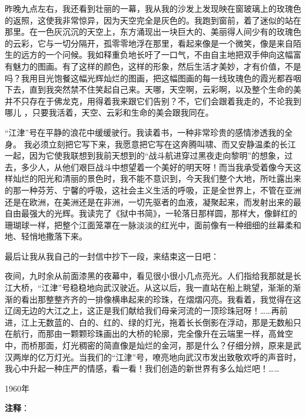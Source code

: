 \documentclass[12pt,UTF-8,openany]{ctexbook}
\begin{document}
\begin{normalsize}
    昨晚九点左右，我还看到壮丽的一幕，我从我的沙发上发现映在窗玻璃上的玫瑰色的返照，这使我非常惊异，因为天空完全是灰色的。我跑到窗前，着了迷似的站在那里。在一色灰沉沉的天空上，东方涌现出一块巨大的、美丽得人间少有的玫瑰色的云彩，它与一切分隔开，孤零零地浮在那里，看起来像是一个微笑，像是来自陌生的远方的一个问候。我如释重负地长吁了一口气，不由自主地把双手伸向这幅富有魅力的图画。有了这样的颜色，这样的形象，然后生活才美妙，才有价值，不是吗？我用目光饱餐这幅光辉灿烂的图画，把这幅图画的每一线玫瑰色的霞光都吞咽下去，直到我突然禁不住笑起自己来。天哪，天空啊，云彩啊，以及整个生命的美并不只存在于佛龙克，用得着我来跟它们告别？不，它们会跟着我走的，不论我到哪儿 ，只要我活着，天空、云彩和生命的美会跟我同在。
    
    “江津”号在平静的浪花中缓缓驶行。我读着书，一种非常珍贵的感情渗透我的全身。 我必须立刻把它写下来，我愿意把它写在这奔腾叫啸、而又安静温柔的长江一起，因为它使我联想到我前天想到的“战斗航进穿过黑夜走向黎明”的想象，过去，多少人，从他们艰巨战斗中想望着一个美好的明天呀！而当我承受着像今天这样灿烂的阳光和清丽的景色时，我不能不意识到，今天我们整个大地，所吐露出来的那一种芬芳、宁馨的呼吸，这社会主义生活的呼吸，正是全世界上，不管在亚洲还是在欧洲，在美洲还是在非洲，一切先驱者的血液，凝聚起来，而发射出来的最自由最强大的光辉。我读完了《狱中书简》，一轮落日那样圆，那样大，像鲜红的珊瑚球一样，把整个江面笼罩在一脉淡淡的红光中，面前像有一种细细的丝幕柔和地、轻悄地撒落下来。
    
    最后让我从我自己的一封信中抄下一段，来结束这一日吧：
    
    夜间，九时余从前面漆黑的夜幕中，看见很小很小几点亮光。人们指给我那就是长江大桥，“江津”号稳稳地向武汉驶近。从这以后，我一直站在船上眺望，渐渐的渐渐的看出那整整齐齐的一排像横串起来的珍珠，在熠熠闪亮。我看着，我觉得在这辽阔无边的大江之上，这正是我们献给我们母亲河流的一顶珍珠冠呀！……再前进，江上无数蓝的、白的、红的、绿的灯光，拖着长长倒影在浮动，那是无数船只在航行，而那由一颗颗珍珠画出的大桥的轮廓，完全像升在云端里一样，高耸空中，而桥那面，灯光稠密的简直像是灿烂的金河，那是什么？仔细分辨，原来是武汉两岸的亿万灯光。当我们的“江津”号，嘹亮地向武汉市发出致敬欢呼的声音时，我心中升起一种庄严的情感，看一看！我们创造的新世界有多么灿烂吧！……
    
    \hfill 1960年
    
\end{normalsize}


\newpage

\textbf{注释}：

\vspace{-1em}
\end{document}
